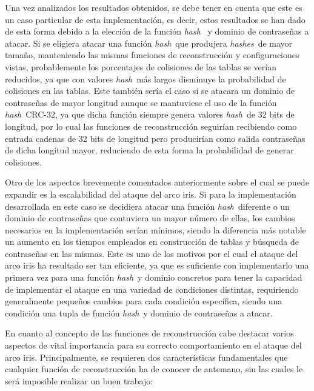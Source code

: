 \documentclass[12pt,spanish,listoffigures,listoftables]{tfgetsinf}
\newcommand{\hash}{\textit{hash}}
\newcommand{\hashes}{\textit{hashes}}
\begin{document}
Una vez analizados los resultados obtenidos, se debe tener en cuenta que este es un caso particular de esta implementación, es decir, estos resultados se han dado de esta forma debido a la elección de la función \hash~ y dominio de contraseñas a atacar. Si se eligiera atacar una función \hash~que produjera \hashes~de mayor tamaño, manteniendo las mismas funciones de reconstrucción y configuraciones vistas, probablemente los porcentajes de colisiones de las tablas se verían reducidos, ya que con valores \hash~más largos disminuye la probabilidad de colisiones en las tablas. Este también sería el caso si se atacara un dominio de contraseñas de mayor longitud aunque se mantuviese el uso de la función \hash~CRC-32, ya que dicha función siempre genera valores \hash~de 32 bits de longitud, por lo cual las funciones de reconstrucción seguirían recibiendo como entrada cadenas de 32 bits de longitud pero producirían como salida contraseñas de dicha longitud mayor, reduciendo de esta forma la probabilidad de generar colisiones.

Otro de los aspectos brevemente comentados anteriormente sobre el cual se puede expandir es la escalabilidad del ataque del arco iris. Si para la implementación desarrollada en este caso se decidiera atacar una función \hash~diferente o un dominio de contraseñas que contuviera un mayor número de ellas, los cambios necesarios en la implementación serían mínimos, siendo la diferencia más notable un aumento en los tiempos empleados en construcción de tablas y búsqueda de contraseñas en las mismas. Este es uno de los motivos por el cual el ataque del arco iris ha resultado ser tan eficiente, ya que es suficiente con implementarlo una primera vez para una función \hash~y dominio concretos para tener la capacidad de implementar el ataque en una variedad de condiciones distintas, requiriendo generalmente pequeños cambios para cada condición específica, siendo una condición una tupla de función \hash~y dominio de contraseñas a atacar.

En cuanto al concepto de las funciones de reconstrucción cabe destacar varios aspectos de vital importancia para su correcto comportamiento en el ataque del arco iris. Principalmente, se requieren dos características fundamentales que cualquier función de reconstrucción ha de conocer de antemano, sin las cuales le será imposible realizar un buen trabajo:
\end{document}
